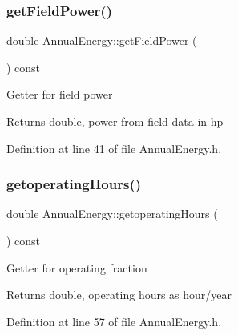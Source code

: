 \mbox{\label{class_annual_energy_a52aa52274243f578ea7f92d27707cacb}} 
\subsubsection{\texorpdfstring{get\+Field\+Power()}{getFieldPower()}\hspace{0.1cm}{\footnotesize\ttfamily [3/3]}}
{\footnotesize\ttfamily double Annual\+Energy\+::get\+Field\+Power (\begin{DoxyParamCaption}{ }\end{DoxyParamCaption}) const\hspace{0.3cm}{\ttfamily [inline]}}

Getter for field power \begin{DoxyReturn}{Returns}
double, power from field data in hp 
\end{DoxyReturn}


Definition at line 41 of file Annual\+Energy.\+h.

\mbox{\label{class_annual_energy_a86a176d57507c7be77d0ead5f794af28}} 
\subsubsection{\texorpdfstring{getoperating\+Hours()}{getoperatingHours()}\hspace{0.1cm}{\footnotesize\ttfamily [1/3]}}
{\footnotesize\ttfamily double Annual\+Energy\+::getoperating\+Hours (\begin{DoxyParamCaption}{ }\end{DoxyParamCaption}) const\hspace{0.3cm}{\ttfamily [inline]}}

Getter for operating fraction \begin{DoxyReturn}{Returns}
double, operating hours as hour/year 
\end{DoxyReturn}


Definition at line 57 of file Annual\+Energy.\+h.

\mbox{\label{class_annual_energy_a86a176d57507c7be77d0ead5f794af28}} 
